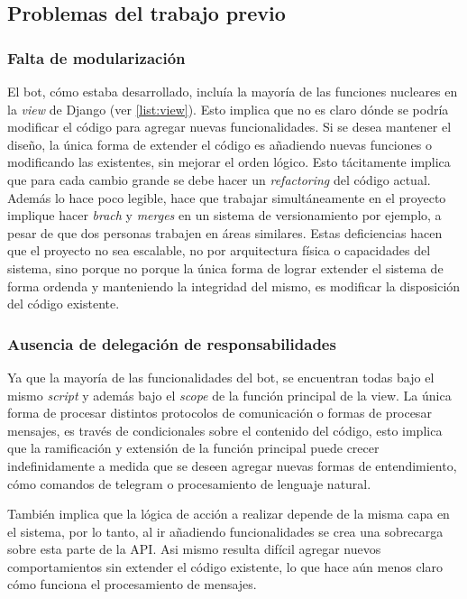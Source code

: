     \subsection{Problemas del trabajo previo}
        \subsubsection{Falta de modularización}
            \par El bot, cómo estaba desarrollado, incluía la mayoría de las funciones nucleares en la \textit{view} de \gls{Django} (ver \ref{list:view}). Esto implica que no es claro dónde se podría modificar el código para agregar nuevas funcionalidades. Si se desea mantener el diseño, la única forma de extender el código es añadiendo nuevas funciones o modificando las existentes, sin mejorar el orden lógico. Esto tácitamente implica que para cada cambio grande se debe hacer un \textit{refactoring} del código actual. Además lo hace poco legible, hace que trabajar simultáneamente en el proyecto implique hacer \textit{brach} y \textit{merges} en un sistema de versionamiento por ejemplo, a pesar de que dos personas trabajen en áreas similares. Estas deficiencias hacen que el proyecto no sea escalable, no por arquitectura física o capacidades del sistema, sino porque no porque la única forma de lograr extender el sistema de forma ordenda y manteniendo la integridad del mismo, es modificar la disposición del código existente. 
            
        \subsubsection{Ausencia de delegación de responsabilidades}
            \par Ya que la mayoría de las funcionalidades del bot, se encuentran todas bajo el mismo \textit{script} y además bajo el \textit{scope} de la función principal de la view. La única forma de procesar distintos protocolos de comunicación o formas de procesar mensajes, es través de condicionales sobre el contenido del código, esto implica que la ramificación y extensión de la función principal puede crecer indefinidamente a medida que se deseen agregar nuevas formas de entendimiento, cómo comandos de telegram o procesamiento de lenguaje natural.
            \par También implica que la lógica de acción a realizar depende de la misma capa en el sistema, por lo tanto, al ir añadiendo funcionalidades se crea una sobrecarga sobre esta parte de la API. Asi mismo resulta difícil agregar nuevos comportamientos sin extender el código existente, lo que hace aún menos claro cómo funciona el procesamiento de mensajes.
